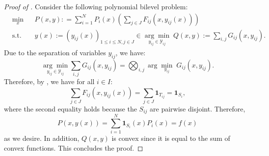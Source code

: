 \documentclass{article}
\newcommand{\mbf}[1]{\mathbf{#1}}
\newcommand*{\cY}{\mathcal{Y}}
\newcommand{\argmin}{\arg\min}
\newcommand{\firstvar}{x}
\newcommand{\secondvar}{y}
\theoremstyle{plain}
\theoremstyle{definition}
\begin{document}
\begin{proof}[Proof of ]
    Consider the following polynomial bilevel problem:
    \begin{equation*}
        \begin{aligned}
            &\min_{\firstvar} && P(\firstvar,\secondvar): = \sum_{i = 1}^N P_i(\firstvar)\left(\sum_{j \in J} F_{ij}(\firstvar, \secondvar_{ij}(\firstvar))\right)\\
            &\text{s.t.} && \secondvar(\firstvar) := (\secondvar_{ij}(x))_{1 \leq i \leq {N}, j \in J} \in \underset{\secondvar_{ij}\in\cY_{ij}}{\argmin} \; Q(\firstvar, \secondvar) := \sum_{i,j} G_{ij}(\firstvar, \secondvar_{ij}).
    \end{aligned} 
    \end{equation*}
    Due to the separation of variables $y_{ij}$, we have:
    \begin{equation*}
        \underset{\secondvar_{ij}\in\cY_{ij}}{\argmin} \sum_{i,j} G_{ij}(\firstvar, \secondvar_{ij}) = \bigotimes_{i, j} \argmin_{y_{ij}} \; G_{ij}(x, y_{ij}).
    \end{equation*}
    Therefore, by , we have for all $i \in I$:
    \begin{equation*}
        \sum_{j \in J} F_{ij}(\firstvar, \secondvar_{ij}(\firstvar)) = \sum_{j \in J} \mbf{1}_{T_{ij}} = \mbf{1}_{S_i},
    \end{equation*}
    where the second equality holds because the $S_{ij}$ are pairwise disjoint. Therefore, $$P(x,y(x)) = \sum_{i = 1}^N \mbf{1}_{S_i}(x)P_i(x) = f(x)$$ as we desire. In addition, $Q(\firstvar,\secondvar)$ is convex since it is equal to the sum of convex functions. This concludes the proof.
\end{proof}
\end{document}
